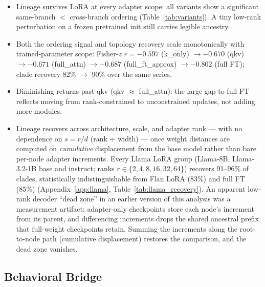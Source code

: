 \documentclass{article}
\begin{document}
\begin{itemize}
  \item Lineage survives LoRA at every adapter scope: all variants show a significant
    same-branch $<$ cross-branch ordering (Table~\ref{tab:variants}). A tiny low-rank
    perturbation on a frozen pretrained init still carries legible ancestry.
  \item Both the ordering signal and topology recovery scale monotonically with trained-parameter
    scope: Fisher-$z$ $r = -0.597$ (k\_only) $\to -0.670$ (qkv) $\to -0.671$ (full\_attn) $\to
    -0.687$ (full\_ft\_approx) $\to -0.802$ (full FT); clade recovery 82\% $\to$ 90\% over the same
    series.
  \item Diminishing returns past qkv (qkv $\approx$ full\_attn): the large gap to full FT reflects
    moving from rank-constrained to unconstrained updates, not adding more modules.
  \item Lineage recovers across architecture, scale, and adapter rank --- with no dependence on
    $s = r/d$ (rank $\div$ width) --- once weight distances are computed on \emph{cumulative}
    displacement from the base model rather than bare per-node adapter increments. Every Llama LoRA
    group (Llama-8B, Llama-3.2-1B base and instruct; ranks $r\in\{2,4,8,16,32,64\}$) recovers
    91--96\% of clades, statistically indistinguishable from Flan LoRA (83\%) and full FT (85\%)
    (Appendix~\ref{app:llama}, Table~\ref{tab:llama_recovery}). An apparent low-rank decoder
    ``dead zone'' in an earlier version of this analysis was a measurement artifact: adapter-only
    checkpoints store each node's increment from its parent, and differencing increments drops the
    shared ancestral prefix that full-weight checkpoints retain. Summing the increments along the
    root-to-node path (cumulative displacement) restores the comparison, and the dead zone vanishes.
\end{itemize}


\subsection{Behavioral Bridge}
\label{sec:results:behavioral}
\end{document}
